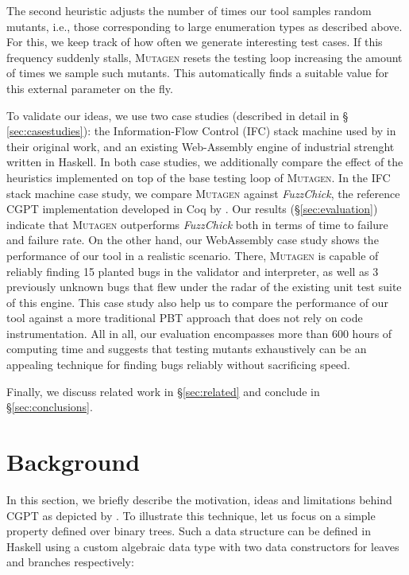 \documentclass[sigconf, anonymous, review]{acmart}
\newcommand{\fuzzchick}{\textit{FuzzChick}\xspace}
\newcommand{\mutagen}{\textsc{Mutagen}\xspace}
\begin{document}
The second heuristic adjusts the number of times our tool samples random
mutants, i.e., those corresponding to large enumeration types as described
above.
%
For this, we keep track of how often we generate interesting test cases.
%
If this frequency suddenly stalls, \mutagen resets the testing loop increasing
the amount of times we sample such mutants.
%
This automatically finds a suitable value for this external parameter on the
fly.


To validate our ideas, we use two case studies (described in detail in \S
\ref{sec:casestudies}): the Information-Flow Control (IFC) stack machine used by
\citeauthor{lampropoulos2019coverage} in their original work, and an existing
{Web-Assembly} engine of industrial strenght written in Haskell.
%
In both case studies, we additionally compare the effect of the heuristics
implemented on top of the base testing loop of \mutagen.
%
In the IFC stack machine case study, we compare \mutagen against \fuzzchick, the
reference CGPT implementation developed in Coq by
\citeauthor{lampropoulos2019coverage}.
%
Our results (\S \ref{sec:evaluation}) indicate that \mutagen outperforms
\fuzzchick both in terms of time to failure and failure rate.
%
On the other hand, our WebAssembly case study shows the performance of our tool
in a realistic scenario.
%
There, \mutagen is capable of reliably finding 15 planted bugs in the validator
and interpreter, as well as 3 previously unknown bugs that flew under the radar
of the existing unit test suite of this engine.
%
This case study also help us to compare the performance of our tool against a
more traditional PBT approach that does not rely on code instrumentation.
%
All in all, our evaluation encompasses more than 600 hours of computing time and
suggests that testing mutants exhaustively can be an appealing technique for
finding bugs reliably without sacrificing speed.

Finally, we discuss related work in \S \ref{sec:related} and conclude
in \S \ref{sec:conclusions}.



\section{Background}
\label{sec:background}

In this section, we briefly describe the motivation, ideas and limitations
behind CGPT as depicted by \citeauthor{lampropoulos2019coverage}.
%
To illustrate this technique, let us focus on a simple property defined over
binary trees.
%
Such a data structure can be defined in Haskell using a custom algebraic data
type with two data constructors for leaves and branches respectively:
\end{document}

